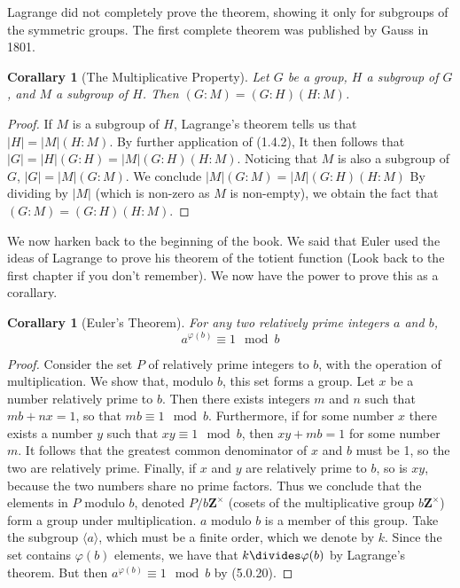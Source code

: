 \documentclass[12pt]{report}
\newtheorem{corallary}[theorem]{Corallary}
\begin{document}
Lagrange did not completely prove the theorem, showing it only for subgroups of the symmetric groups. The first complete theorem was published by Gauss in 1801.

\begin{corallary}[The Multiplicative Property]
    Let $G$ be a group, $H$ a subgroup of $G$, and $M$ a subgroup of $H$. Then $(G:M) = (G:H)(H:M)$.
\end{corallary}
\begin{proof}
    If $M$ is a subgroup of $H$, Lagrange's theorem tells us that $|H| = |M|(H:M)$. By further application of (1.4.2), It then follows that $|G| = |H|(G:H) = |M|(G:H)(H:M)$. Noticing that $M$ is also a subgroup of $G$, $|G| = |M|(G:M)$. We conclude $|M|(G:M) = |M|(G:H)(H:M)$ By dividing by $|M|$ (which is non-zero as $M$ is non-empty), we obtain the fact that $(G:M) = (G:H)(H:M)$.
\end{proof}

We now harken back to the beginning of the book. We said that Euler used the ideas of Lagrange to prove his theorem of the totient function (Look back to the first chapter if you don't remember). We now have the power to prove this as a corallary.

\begin{corallary}[Euler's Theorem]
    For any two relatively prime integers $a$ and $b$,
    \[ a^{\varphi(b)} \equiv 1 \mod{b} \]
\end{corallary}
\begin{proof}
    Consider the set $P$ of relatively prime integers to $b$, with the operation of multiplication. We show that, modulo $b$, this set forms a group. Let $x$ be a number relatively prime to $b$. Then there exists integers $m$ and $n$ such that $mb + nx = 1$, so that $mb \equiv 1 \mod{b}$. Furthermore, if for some number $x$ there exists a number $y$ such that $xy \equiv 1 \mod{b}$, then $xy + mb = 1$ for some number $m$. It follows that the greatest common denominator of $x$ and $b$ must be 1, so the two are relatively prime. Finally, if $x$ and $y$ are relatively prime to $b$, so is $xy$, because the two numbers share no prime factors. Thus we conclude that the elements in $P$ modulo $b$, denoted $P/b\mathbf{Z}^\times$ (cosets of the multiplicative group $b\mathbf{Z}^\times$) form a group under multiplication. $a$ modulo $b$ is a member of this group. Take the subgroup $\langle a \rangle$, which must be a finite order, which we denote by $k$. Since the set contains $\varphi(b)$ elements, we have that $k \divides \varphi(b)$ by Lagrange's theorem. But then $a^{\varphi(b)} \equiv 1 \mod{b}$ by (5.0.20).
\end{proof}
\end{document}
